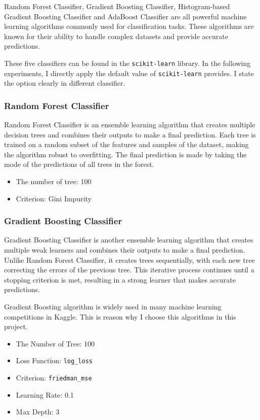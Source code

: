 \documentclass[twocolumn]{extarticle}
\begin{document}
Random Forest Classifier, Gradient Boosting Classifier, Histogram-based Gradient Boosting Classifier and AdaBoost Classifier are all powerful machine learning algorithms commonly used for classification tasks. These algorithms are known for their ability to handle complex datasets and provide accurate predictions.

These five classifiers can be found in the \texttt{scikit-learn} library. In the following experiments, I directly apply the default value of \texttt{scikit-learn} provides. I state the option clearly in different classifier.

\subsubsection{Random Forest Classifier}

Random Forest Classifier is an ensemble learning algorithm that creates multiple decision trees and combines their outputs to make a final prediction. Each tree is trained on a random subset of the features and samples of the dataset, making the algorithm robust to overfitting. The final prediction is made by taking the mode of the predictions of all trees in the forest.

\begin{itemize}
\item The number of tree: 100
\item Criterion: Gini Impurity
\end{itemize}

\subsubsection{Gradient Boosting Classifier}

Gradient Boosting Classifier is another ensemble learning algorithm that creates multiple weak learners and combines their outputs to make a final prediction. Unlike Random Forest Classifier, it creates trees sequentially, with each new tree correcting the errors of the previous tree. This iterative process continues until a stopping criterion is met, resulting in a strong learner that makes accurate predictions.

Gradient Boosting algorithm is widely used in many machine learning competitions in Kaggle. This is reason why I choose this algorithms in this project.

\begin{itemize}
\item The Number of Tree: 100
\item Loss Function: \texttt{log\_loss}
\item Criterion: \texttt{friedman\_mse}
\item Learning Rate: 0.1
\item Max Depth: 3
\end{itemize}
\end{document}
